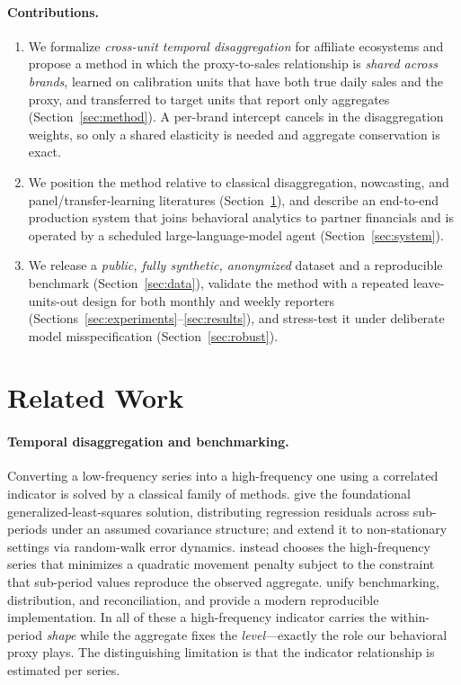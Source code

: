 \documentclass[11pt]{article}
\begin{document}
\paragraph{Contributions.}
\begin{enumerate}
\item We formalize \emph{cross-unit temporal disaggregation} for affiliate
ecosystems and propose a method in which the proxy-to-sales relationship is
\emph{shared across brands}, learned on calibration units that have both true
daily sales and the proxy, and transferred to target units that report only
aggregates (Section~\ref{sec:method}). A per-brand intercept cancels in the
disaggregation weights, so only a shared elasticity is needed and aggregate
conservation is exact.
\item We position the method relative to classical disaggregation, nowcasting,
and panel/transfer-learning literatures (Section~\ref{sec:related}), and
describe an end-to-end production system that joins behavioral analytics to
partner financials and is operated by a scheduled large-language-model agent
(Section~\ref{sec:system}).
\item We release a \emph{public, fully synthetic, anonymized} dataset and a
reproducible benchmark (Section~\ref{sec:data}), validate the method with a
repeated leave-units-out design for both monthly and weekly reporters
(Sections~\ref{sec:experiments}--\ref{sec:results}), and stress-test it under
deliberate model misspecification (Section~\ref{sec:robust}).
\end{enumerate}

\section{Related Work}\label{sec:related}

\paragraph{Temporal disaggregation and benchmarking.}
Converting a low-frequency series into a high-frequency one using a correlated
indicator is solved by a classical family of methods. \citet{ChowLin1971}
give the foundational generalized-least-squares solution, distributing
regression residuals across sub-periods under an assumed covariance structure;
\citet{Fernandez1981} and \citet{Litterman1983} extend it to non-stationary
settings via random-walk error dynamics. \citet{Denton1971} instead chooses the
high-frequency series that minimizes a quadratic movement penalty subject to the
constraint that sub-period values reproduce the observed aggregate.
\citet{DagumCholette2006} unify benchmarking, distribution, and reconciliation,
and \citet{SaxSteiner2013} provide a modern reproducible implementation. In all
of these a high-frequency indicator carries the within-period \emph{shape} while
the aggregate fixes the \emph{level}---exactly the role our behavioral proxy
plays. The distinguishing limitation is that the indicator relationship is
estimated per series.
\end{document}
